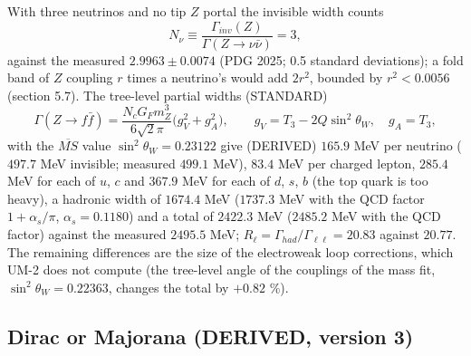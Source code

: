 \documentclass[
  10pt,
]{article}
\begin{document}
With three neutrinos and no tip \(Z\) portal the invisible width counts
\[ N_\nu \equiv \frac{\Gamma_{inv}(Z)}{\Gamma(Z\to\nu\bar\nu)} = 3, \]
against the measured \(2.9963 \pm 0.0074\) (PDG 2025; 0.5 standard
deviations); a fold band of \(Z\) coupling \(r\) times a neutrino's
would add \(2r^2\), bounded by \(r^2 < 0.0056\) (section 5.7). The
tree-level partial widths (STANDARD)
\[ \Gamma(Z\to f\bar f) = \frac{N_cG_Fm_Z^3}{6\sqrt2\pi}\big(g_V^2 + g_A^2\big),\qquad g_V = T_3 - 2Q\sin^2\theta_W,\quad g_A = T_3 , \]
with the \(\overline{MS}\) value \(\sin^2\theta_W = 0.23122\) give
(DERIVED) \(165.9\) MeV per neutrino (\(497.7\) MeV invisible; measured
\(499.1\) MeV), \(83.4\) MeV per charged lepton, \(285.4\) MeV for each
of \(u\), \(c\) and \(367.9\) MeV for each of \(d\), \(s\), \(b\) (the
top quark is too heavy), a hadronic width of \(1674.4\) MeV (\(1737.3\)
MeV with the QCD factor \(1 + \alpha_s/\pi\), \(\alpha_s = 0.1180\)) and
a total of \(2422.3\) MeV (\(2485.2\) MeV with the QCD factor) against
the measured \(2495.5\) MeV;
\(R_\ell = \Gamma_{had}/\Gamma_{\ell\ell} = 20.83\) against \(20.77\).
The remaining differences are the size of the electroweak loop
corrections, which UM-2 does not compute (the tree-level angle of the
couplings of the mass fit, \(\sin^2\theta_W = 0.22363\), changes the
total by \(+0.82\) \%).

\hypertarget{dirac-or-majorana-derived-version-3}{%
\subsection{Dirac or Majorana (DERIVED, version
3)}\label{dirac-or-majorana-derived-version-3}}
\end{document}
